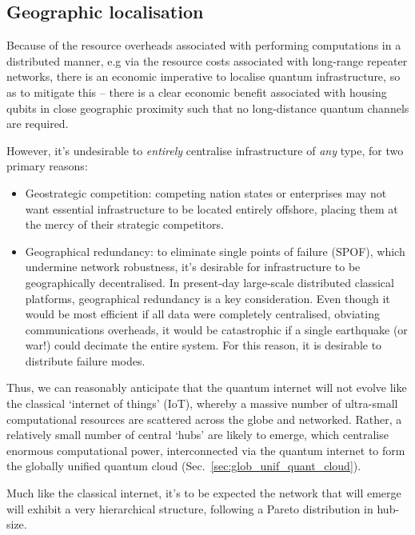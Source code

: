 \subsection{Geographic localisation}\label{sec:geo_loc}

Because of the resource overheads associated with performing computations in a distributed manner, e.g via the resource costs associated with long-range repeater networks, there is an economic imperative to localise quantum infrastructure, so as to mitigate this -- there is a clear economic benefit associated with housing qubits in close geographic proximity such that no long-distance quantum channels are required.

However, it's undesirable to \textit{entirely} centralise infrastructure of \textit{any} type, for two primary reasons:
\begin{itemize}
	\item Geostrategic competition: competing nation states or enterprises may not want essential infrastructure to be located entirely offshore, placing them at the mercy of their strategic competitors.
	\item Geographical redundancy: to eliminate single points of failure (SPOF), which undermine network robustness, it's desirable for infrastructure to be geographically decentralised. In present-day large-scale distributed classical platforms, geographical redundancy is a key consideration. Even though it would be most efficient if all data were completely centralised, obviating communications overheads, it would be catastrophic if a single earthquake (or war!) could decimate the entire system. For this reason, it is desirable to distribute failure modes.
\end{itemize}

Thus, we can reasonably anticipate that the quantum internet will not evolve like the classical `internet of things' (IoT), whereby a massive number of ultra-small computational resources are scattered across the globe and networked. Rather, a relatively small number of central `hubs' are likely to emerge, which centralise enormous computational power, interconnected via the quantum internet to form the globally unified quantum cloud (Sec.~\ref{sec:glob_unif_quant_cloud}).

Much like the classical internet, it's to be expected the network that will emerge will exhibit a very hierarchical structure, following a Pareto distribution in hub-size.


